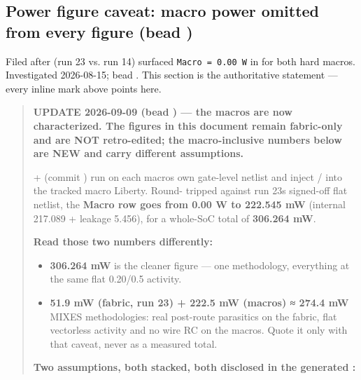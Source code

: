 \subsection{\texorpdfstring{Power figure caveat: macro power omitted
from every figure (bead
)}{Power figure caveat: macro power omitted from every figure (bead )}}\label{cr:run:phase5:power-figure-caveat-macro-power-omitted-from-every-figure-bead-ew3}

\begin{record}

Filed after  (run 23 vs. run 14) surfaced
\texttt{Macro\ =\allowbreak{}\ 0.\allowbreak{}00\ W} in
 for both hard macros. Investigated 2026-08-15; bead
. This section is the authoritative
statement --- every inline \warn{} mark above points here.

\begin{quote}
\textbf{UPDATE 2026-09-09 (bead ) --- the macros are now
characterized. The figures in this document remain fabric-only and are
NOT retro-edited; the macro-inclusive numbers below are NEW and carry
different assumptions.}

 +
 (commit ) run
 on each macro\textquotesingle s own gate-level
netlist and inject  / 
into the tracked macro Liberty. Round- tripped against run
23\textquotesingle s signed-off flat netlist, the \textbf{Macro row goes
from 0.00 W to 222.545 mW} (internal 217.089 + leakage 5.456), for a
whole-SoC total of \textbf{306.264 mW}.

\textbf{Read those two numbers differently:}

\begin{itemize}
\tightlist
\item
  \textbf{306.264 mW} is the cleaner figure --- one methodology,
  everything at the same flat 0.20/0.5 activity.
\item
  \textbf{51.9 mW (fabric, run 23) + 222.5 mW (macros) ≈ 274.4 mW} MIXES
  methodologies: real post-route parasitics on the fabric, flat
  vectorless activity and no wire RC on the macros. Quote it only with
  that caveat, never as a measured total.
\end{itemize}

\textbf{Two assumptions, both stacked, both disclosed in the generated
:}


\end{quote}
\end{record}
